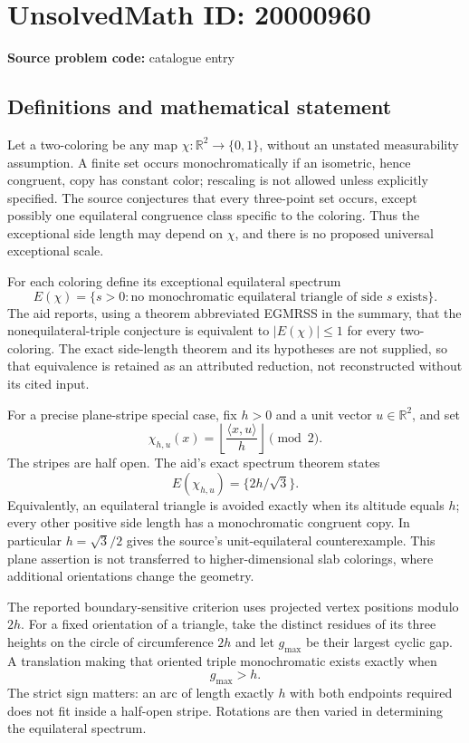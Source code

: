\documentclass[11pt]{article}
\newcommand{\R}{\mathbb{R}}
\begin{document}
\section*{UnsolvedMath ID: 20000960}
\textbf{Source problem code:} catalogue entry
\subsection{Definitions and mathematical statement}
Let a two-coloring be any map $\chi:\R^2\to\{0,1\}$, without an unstated measurability assumption. A finite set occurs monochromatically if an isometric, hence congruent, copy has constant color; rescaling is not allowed unless explicitly specified. The source conjectures that every three-point set occurs, except possibly one equilateral congruence class specific to the coloring. Thus the exceptional side length may depend on $\chi$, and there is no proposed universal exceptional scale.

For each coloring define its exceptional equilateral spectrum
\[
 E(\chi)=\{s>0:\text{no monochromatic equilateral triangle of side }s\text{ exists}\}.
\]
The aid reports, using a theorem abbreviated EGMRSS in the summary, that the nonequilateral-triple conjecture is equivalent to $|E(\chi)|\leq1$ for every two-coloring. The exact side-length theorem and its hypotheses are not supplied, so that equivalence is retained as an attributed reduction, not reconstructed without its cited input.

For a precise plane-stripe special case, fix $h>0$ and a unit vector $u\in\R^2$, and set
\[
 \chi_{h,u}(x)=\left\lfloor\frac{\langle x,u\rangle}{h}\right\rfloor\pmod2.
\]
The stripes are half open. The aid's exact spectrum theorem states
\[
 E(\chi_{h,u})=\{2h/\sqrt3\}.
\]
Equivalently, an equilateral triangle is avoided exactly when its altitude equals $h$; every other positive side length has a monochromatic congruent copy. In particular $h=\sqrt3/2$ gives the source's unit-equilateral counterexample. This plane assertion is not transferred to higher-dimensional slab colorings, where additional orientations change the geometry.

The reported boundary-sensitive criterion uses projected vertex positions modulo $2h$. For a fixed orientation of a triangle, take the distinct residues of its three heights on the circle of circumference $2h$ and let $g_{\max}$ be their largest cyclic gap. A translation making that oriented triple monochromatic exists exactly when
\[
 g_{\max}>h.
\]
The strict sign matters: an arc of length exactly $h$ with both endpoints required does not fit inside a half-open stripe. Rotations are then varied in determining the equilateral spectrum.
\end{document}
